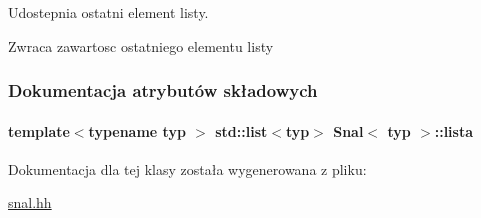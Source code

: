 Udostepnia ostatni element listy. 

\begin{DoxyReturn}{Zwraca}
zawartosc ostatniego elementu listy 
\end{DoxyReturn}


\subsubsection{Dokumentacja atrybutów składowych}
\hypertarget{class_snal_afa289576c79de5b33bc2964cd20ed653}{
\paragraph[{lista}]{\setlength{\rightskip}{0pt plus 5cm}template$<$typename typ $>$ std\-::list$<$typ$>$ {\bf Snal}$<$ typ $>$\-::lista\hspace{0.3cm}{\ttfamily [private]}}}\label{class_snal_afa289576c79de5b33bc2964cd20ed653}


Dokumentacja dla tej klasy została wygenerowana z pliku\-:\begin{DoxyCompactItemize}
\item 
\hyperlink{snal_8hh}{snal.\-hh}\end{DoxyCompactItemize}
